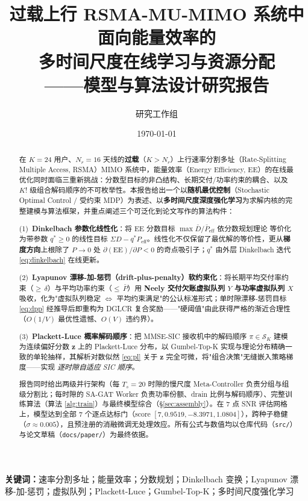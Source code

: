 \documentclass[UTF8,11pt,a4paper]{ctexart}
\title{\textbf{过载上行 RSMA-MU-MIMO 系统中面向能量效率的\\多时间尺度在线学习与资源分配\\——模型与算法设计研究报告}}
\author{研究工作组}
\date{\today}
\theoremstyle{plain}
\theoremstyle{definition}
\theoremstyle{remark}
\newcommand{\vect}[1]{\mathbf{#1}}
\begin{document}
\maketitle

\begin{abstract}
在 $K=24$ 用户、$N_r=16$ 天线的\textbf{过载}（$K>N_r$）上行速率分割多址（Rate-Splitting Multiple Access, RSMA）MIMO 系统中，能量效率（Energy Efficiency, EE）的在线最优化同时面临三重新挑战：分数型目标的非凸结构、长期交付/功率约束的耦合、以及 $K!$ 级组合解码顺序的不可枚举性。本报告给出一个以\textbf{随机最优控制}（Stochastic Optimal Control / 受约束 MDP）为表述、以\textbf{多时间尺度深度强化学习}为求解内核的完整建模与算法框架，并重点阐述三个可泛化到论文写作的算法构件：

(1)~\textbf{Dinkelbach 参数化线性化}：将 EE 分数目标 $\max \bar{D}/\bar{P}_{\mathrm{eff}}$ 依分数规划理论\cite{dinkelbach1967nonlinear} 等价化为带参数 $q^*\ge0$ 的线性目标 $\Sigma D - q^*P_{\mathrm{eff}}$。线性化不仅保留了最优解的等价性，更从\textbf{梯度方向}上根除了 $P\to0$ 处 $\partial(\text{EE})/\partial P<0$ 的奇点吸引子；$q^*$ 由外层 Dinkelbach 迭代 \eqref{eq:dinkelbach} 在线更新。

(2)~\textbf{Lyapunov 漂移-加-惩罚（drift-plus-penalty）软约束化}：将长期平均交付率约束（${\ge}\,\delta$）与平均功率约束（${\le}\,\bar P$）用 \textbf{Neely 交付欠账虚拟队列 $Y$ 与功率虚拟队列 $X$} 吸收，化为"虚拟队列稳定 $\Leftrightarrow$ 平均约束满足"的公认标准形式；单时隙漂移-惩罚目标 \eqref{eq:dpp} 经推导后即重构为 DGLCR 复合奖励——"硬阈值"由此获得严格的渐近合理性（$O(1/V)$ 最优性遗憾、$O(V)$ 违约界）。

(3)~\textbf{Plackett-Luce 概率解码顺序}：把 MMSE-SIC 接收机中的解码顺序 $\pi\in\mathcal{S}_K$ 建模为连续偏好分数 $\vect z$ 上的 Plackett-Luce 分布，以 Gumbel-Top-K 实现与理论分布精确一致的单轮抽样，其解析对数似然 \eqref{eq:pl} 关于 $\vect z$ 完全可微，将"组合决策"无缝嵌入策略梯度——实现 \emph{逐时隙自适应 SIC 顺序}。

报告同时给出两级并行架构（每 $T_s=20$ 时隙的慢尺度 Meta-Controller 负责分组与组级分割比；每时隙的 SA-GAT Worker 负责功率份额、drain 比例与解码顺序）、完整训练算法（算法 \ref{alg:train}）与最终模型综合（\S\ref{sec:assembly}）。在 7 点 SNR 评估网格上，模型达到全部 7 个逐点达标门（score $[7,0.9519,-8.3971,1.0804]$），跨种子稳健（$\sigma\approx0.005$），且预注册的消融微调无处理效应。所有公式与数值均以仓库代码（\texttt{src/}）与论文草稿（\texttt{docs/paper/}）为最终依据。
\end{abstract}

\noindent\textbf{关键词：}速率分割多址；能量效率；分数规划；Dinkelbach 变换；Lyapunov 漂移-加-惩罚；虚拟队列；Plackett-Luce；Gumbel-Top-K；多时间尺度强化学习
\end{document}
